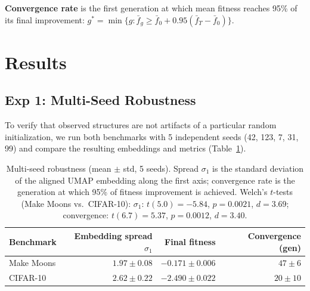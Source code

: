 \documentclass{article}
\begin{document}
\textbf{Convergence rate} is the first generation at which mean
fitness reaches 95\% of its final improvement:
$g^* = \min \{g : \bar{f}_g \geq \bar{f}_0 + 0.95(\bar{f}_T - \bar{f}_0)\}$.


\section{Results}
\label{sec:results}

\subsection{Exp 1: Multi-Seed Robustness}
\label{sec:exp1}

To verify that observed structures are not artifacts of a particular
random initialization, we run both benchmarks with 5 independent seeds
(42, 123, 7, 31, 99) and compare the resulting embeddings and metrics
(Table~\ref{tab:exp1}).

\begin{table}[!ht]
  \caption{Multi-seed robustness (mean $\pm$ std, 5 seeds). Spread
  $\sigma_1$ is the standard deviation of the aligned UMAP embedding
  along the first axis; convergence rate is the generation at which
  95\% of fitness improvement is achieved.
  Welch's $t$-tests (Make Moons vs.\ CIFAR-10):
  $\sigma_1$: $t(5.0)=-5.84$, $p=0.0021$, $d=3.69$;
  convergence: $t(6.7)=5.37$, $p=0.0012$, $d=3.40$.}
  \label{tab:exp1}
  \centering
  \begin{tabular}{lrrr}
    \toprule
    Benchmark & Embedding spread $\sigma_1$ & Final fitness & Convergence (gen) \\
    \midrule
    Make Moons & $1.97 \pm 0.08$ & $-0.171 \pm 0.006$ & $47 \pm 6$ \\
    CIFAR-10   & $2.62 \pm 0.22$ & $-2.490 \pm 0.022$ & $20 \pm 10$ \\
    \bottomrule
  \end{tabular}
\end{table}
\end{document}
